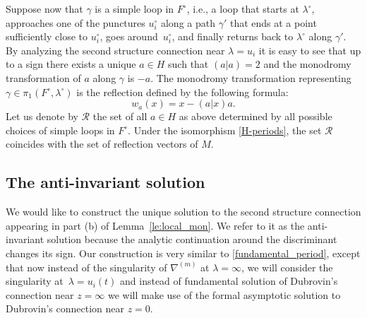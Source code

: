 \documentclass[10pt,a4paper]{article}
\numberwithin{equation}{section}
\begin{document}
Suppose now that $\gamma$ is a simple loop in $F^\circ$, i.e., a loop
that starts at $\lambda^\circ$,
approaches one of the punctures $u_i^\circ$ along a path $\gamma'$
that ends at a point sufficiently close to $u_i^\circ$, goes around~$u_i^\circ$, and finally returns back to $\lambda^\circ$ along
$\gamma'$. By analyzing the second structure connection near
$\lambda=u_i$ it is easy to see that up to a sign there exists a unique $a\in H$
such that $(a|a)=2$ and the monodromy transformation of $a$ along
$\gamma$ is $-a$. The monodromy transformation representing $\gamma\in
\pi_1(F^\circ,\lambda^\circ)$ is the reflection defined by the
following formula:
\[%
w_a(x)=x-(a|x) a.
\]
Let us denote by $\mathcal{R}$ the set of all $a\in H$ as above determined by
all possible choices of simple loops in $F^\circ$. Under the
isomorphism \eqref{H-periods}, the set $\mathcal{R}$ coincides with
the set of reflection vectors of $M$.

\subsection{The anti-invariant solution}\label{sec:ai_sol}
We would like to construct the unique solution to the second structure
connection appearing in part (b) of Lemma~\ref{le:local_mon}. We refer to
it as the anti-invariant solution because the analytic continuation
around the discriminant changes its sign. Our construction is very
similar to \eqref{fundamental_period}, except that now instead of
the singularity of $\nabla^{(m)}$ at $\lambda=\infty$, we will
consider the singularity at~$\lambda=u_i(t)$ and instead of
fundamental solution of Dubrovin's connection near $z=\infty$ we will
make use of the formal asymptotic solution to Dubrovin's connection
near $z=0$.
\end{document}
